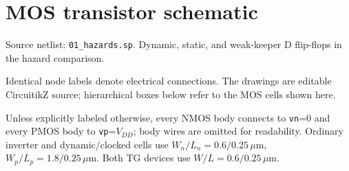\clearpage\section{MOS transistor schematic}
\begingroup\small
Source netlist: \texttt{01\_hazards.sp}. Dynamic, static, and weak-keeper D flip-flops in the hazard comparison.

Identical node labels denote electrical connections. The drawings are editable CircuitikZ source; hierarchical boxes below refer to the MOS cells shown here.

Unless explicitly labeled otherwise, every NMOS body connects to \texttt{vn}=0 and every PMOS body to \texttt{vp}=\(V_{DD}\); body wires are omitted for readability. Ordinary inverter and dynamic/clocked cells use \(W_n/L_n=0.6/0.25\,\mu\mathrm m\), \(W_p/L_p=1.8/0.25\,\mu\mathrm m\). Both TG devices use \(W/L=0.6/0.25\,\mu\mathrm m\). 

